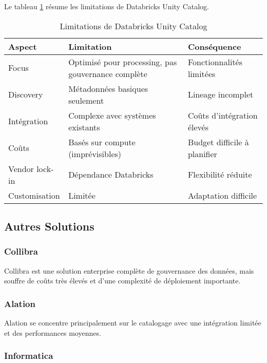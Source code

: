 Le tableau \ref{tab:limitations_databricks} résume les limitations de Databricks Unity Catalog.

\begin{table}[htpb]
\centering
\caption{Limitations de Databricks Unity Catalog}
\label{tab:limitations_databricks}
\begin{tabular}{|p{}|p{}|p{}|}
\hline
\textbf{Aspect} & \textbf{Limitation} & \textbf{Conséquence} \\
\hline
Focus & Optimisé pour processing, pas gouvernance complète & Fonctionnalités limitées \\
\hline
Discovery & Métadonnées basiques seulement & Lineage incomplet \\
\hline
Intégration & Complexe avec systèmes existants & Coûts d'intégration élevés \\
\hline
Coûts & Basés sur compute (imprévisibles) & Budget difficile à planifier \\
\hline
Vendor lock-in & Dépendance Databricks & Flexibilité réduite \\
\hline
Customisation & Limitée & Adaptation difficile \\
\hline
\end{tabular}
\end{table}

\subsection{Autres Solutions}

\subsubsection{Collibra}

Collibra est une solution enterprise complète de gouvernance des données, mais souffre de coûts très élevés et d'une complexité de déploiement importante.

\subsubsection{Alation}

Alation se concentre principalement sur le catalogage avec une intégration limitée et des performances moyennes.

\subsubsection{Informatica}

